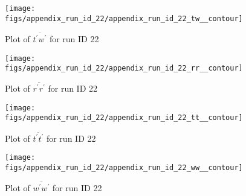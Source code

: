 \begin{figure}[H]
\centering
\texttt{[image: figs/appendix\_run\_id\_22/appendix\_run\_id\_22\_tw\_\_contour]}
\caption{Plot of $\overline{t^\prime w^\prime}$ for run ID 22}
\label{fig:appendix_run_id_22_tw__contour}
\end{figure}


\begin{figure}[H]
\centering
\texttt{[image: figs/appendix\_run\_id\_22/appendix\_run\_id\_22\_rr\_\_contour]}
\caption{Plot of $\overline{r^\prime r^\prime}$ for run ID 22}
\label{fig:appendix_run_id_22_rr__contour}
\end{figure}


\begin{figure}[H]
\centering
\texttt{[image: figs/appendix\_run\_id\_22/appendix\_run\_id\_22\_tt\_\_contour]}
\caption{Plot of $\overline{t^\prime t^\prime}$ for run ID 22}
\label{fig:appendix_run_id_22_tt__contour}
\end{figure}


\begin{figure}[H]
\centering
\texttt{[image: figs/appendix\_run\_id\_22/appendix\_run\_id\_22\_ww\_\_contour]}
\caption{Plot of $\overline{w^\prime w^\prime}$ for run ID 22}
\label{fig:appendix_run_id_22_ww__contour}
\end{figure}


